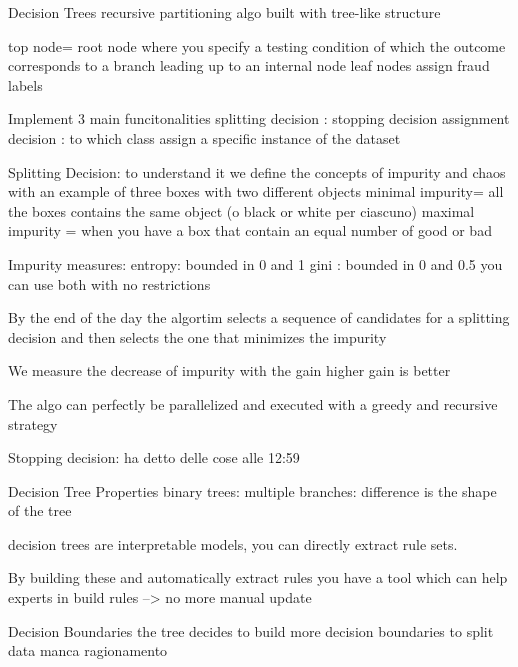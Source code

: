     Decision Trees
        recursive partitioning algo built with tree-like structure 

        top node= root node where you specify a testing condition of which the outcome corresponds to a branch leading up to an internal node 
        leaf nodes assign fraud labels 

        Implement 3 main funcitonalities 
            splitting decision : 
            stopping decision 
            assignment decision : to which class assign a specific instance of the dataset 

            Splitting Decision:
                to understand it we define the concepts of impurity and chaos
                with an example of three boxes with two different objects 
                minimal impurity= all the boxes contains the same object (o black or white per ciascuno)
                maximal impurity = when you have a box that contain an equal number of good or bad 

                Impurity measures:
                    entropy: bounded in 0 and 1
                    gini : bounded in 0 and 0.5
                    you can use both with no restrictions 

                By the end of the day the algortim selects a sequence of candidates for a splitting decision and
                then selects the one that minimizes the impurity 

                We measure the decrease of impurity with the gain 
                higher gain is better

                The algo can perfectly be parallelized and executed with a greedy and recursive strategy

            Stopping decision:
                ha detto delle cose alle 12:59

            Decision Tree Properties
                binary trees:
                multiple branches:
                difference is the shape of the tree

                decision trees are interpretable models, you can directly extract rule sets.

                By building these and automatically extract rules you have a tool which can help 
                experts in build rules --> no more manual update

            Decision Boundaries
                the tree decides to build more decision boundaries to split data 
                manca ragionamento

